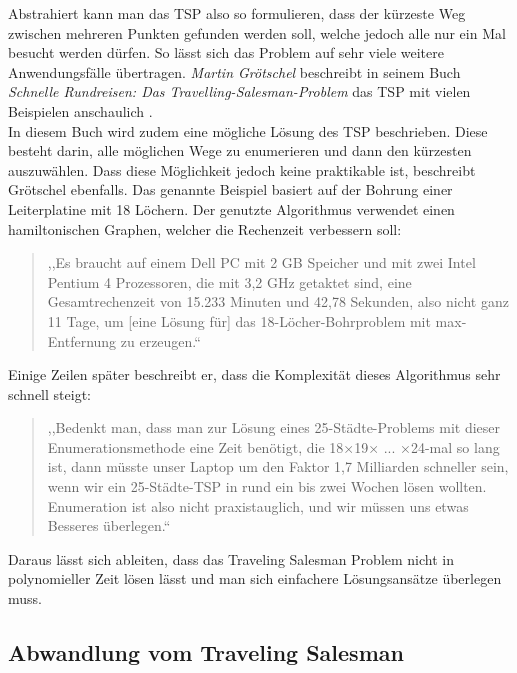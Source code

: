 \documentclass[12pt, a4paper]{article}
\begin{document}
Abstrahiert kann man das TSP also so formulieren, dass der kürzeste Weg zwischen mehreren Punkten gefunden werden soll, welche jedoch alle nur ein Mal besucht werden dürfen. So lässt sich das Problem auf sehr viele weitere Anwendungsfälle übertragen. \textit{Martin Grötschel} beschreibt in seinem Buch \textit{Schnelle Rundreisen: Das Travelling-Salesman-Problem} das TSP mit vielen Beispielen anschaulich \cite[Seite 93-129]{Groetschel.2005}.\\


In diesem Buch wird zudem eine mögliche Lösung des TSP beschrieben. Diese besteht darin, alle möglichen Wege zu enumerieren und dann den kürzesten auszuwählen. Dass diese Möglichkeit jedoch keine praktikable ist, beschreibt Grötschel ebenfalls. Das genannte Beispiel basiert auf der Bohrung einer Leiterplatine mit 18 Löchern. Der genutzte Algorithmus verwendet einen hamiltonischen Graphen, welcher die Rechenzeit verbessern soll:

\begin{quote}
,,Es braucht auf einem Dell PC mit 2 GB Speicher und mit
zwei Intel Pentium 4 Prozessoren, die mit 3,2 GHz getaktet sind, eine Gesamtrechenzeit
von 15.233 Minuten und 42,78 Sekunden, also nicht ganz 11 Tage, um [eine Lösung für] das 18-Löcher-Bohrproblem mit
max-Entfernung zu erzeugen.``  \cite[S. 108]{Groetschel.2005}
\end{quote}
Einige Zeilen später beschreibt er, dass die Komplexität dieses Algorithmus sehr schnell steigt:

\begin{quote}
,,Bedenkt man, dass man zur Lösung eines 25-Städte-Problems mit dieser Enumerationsmethode
eine Zeit benötigt, die 18×19× ... ×24-mal so lang ist, dann
müsste unser Laptop um den Faktor 1,7 Milliarden schneller sein, wenn wir ein
25-Städte-TSP in rund ein bis zwei Wochen lösen wollten. Enumeration ist also
nicht praxistauglich, und wir müssen uns etwas Besseres überlegen.`` \cite[S. 109]{Groetschel.2005}
\end{quote}

Daraus lässt sich ableiten, dass das Traveling Salesman Problem nicht in polynomieller Zeit lösen lässt und man sich einfachere Lösungsansätze überlegen muss.

\subsection{Abwandlung vom Traveling Salesman}
\end{document}
